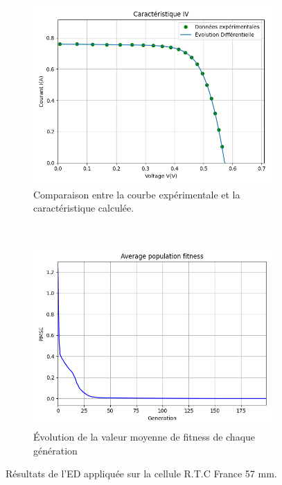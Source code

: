 \begin{figure}
    \centering
    \begin{subfigure}[b]{0.45\textwidth}
        \includegraphics[width=\textwidth]{resources/RTCFrance/singled/iv.png}
        \caption{Comparaison entre la courbe expérimentale et la caractéristique calculée.}
    \end{subfigure}
    ~
    \begin{subfigure}[b]{0.45\textwidth}
        \includegraphics[width=\textwidth]{resources/RTCFrance/singled/fitness.png}
        \caption{Évolution de la valeur moyenne de fitness de chaque génération}
    \end{subfigure}
    \caption{Résultats de l'ED appliquée sur la cellule R.T.C France 57 mm.}
    \label{fig:RTCres}
\end{figure}

